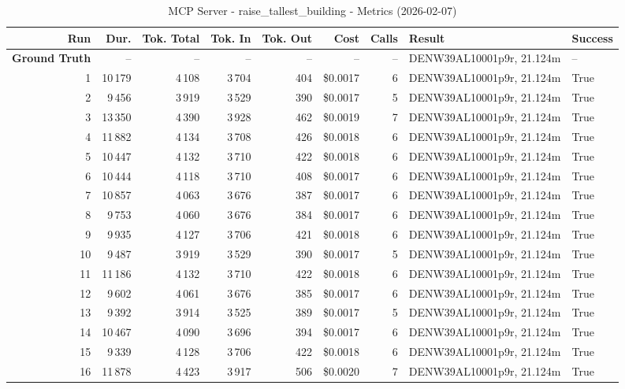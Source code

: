\documentclass[a4paper,11pt]{article}
\begin{document}
\begin{table}[ht]
\centering
\scriptsize
\caption{MCP Server - raise\_tallest\_building - Metrics (2026-02-07)}
\label{tab:mcp\_raise\_tallest\_building\_metrics\_2026-02-07}
\begin{tabular}{r r r r r r r p{3cm} l}
\hline
Run & Dur. & Tok. Total & Tok. In & Tok. Out & Cost & Calls & Result & Success \\
\hline
\textbf{Ground Truth} & -- & -- & -- & -- & -- & -- & DENW39AL10001p9r, 21.124m & -- \\
\hline
1 & 10\,179 & 4\,108 & 3\,704 & 404 & \$0.0017 & 6 & DENW39AL10001p9r, 21.124m & True \\
2 & 9\,456 & 3\,919 & 3\,529 & 390 & \$0.0017 & 5 & DENW39AL10001p9r, 21.124m & True \\
3 & 13\,350 & 4\,390 & 3\,928 & 462 & \$0.0019 & 7 & DENW39AL10001p9r, 21.124m & True \\
4 & 11\,882 & 4\,134 & 3\,708 & 426 & \$0.0018 & 6 & DENW39AL10001p9r, 21.124m & True \\
5 & 10\,447 & 4\,132 & 3\,710 & 422 & \$0.0018 & 6 & DENW39AL10001p9r, 21.124m & True \\
6 & 10\,444 & 4\,118 & 3\,710 & 408 & \$0.0017 & 6 & DENW39AL10001p9r, 21.124m & True \\
7 & 10\,857 & 4\,063 & 3\,676 & 387 & \$0.0017 & 6 & DENW39AL10001p9r, 21.124m & True \\
8 & 9\,753 & 4\,060 & 3\,676 & 384 & \$0.0017 & 6 & DENW39AL10001p9r, 21.124m & True \\
9 & 9\,935 & 4\,127 & 3\,706 & 421 & \$0.0018 & 6 & DENW39AL10001p9r, 21.124m & True \\
10 & 9\,487 & 3\,919 & 3\,529 & 390 & \$0.0017 & 5 & DENW39AL10001p9r, 21.124m & True \\
11 & 11\,186 & 4\,132 & 3\,710 & 422 & \$0.0018 & 6 & DENW39AL10001p9r, 21.124m & True \\
12 & 9\,602 & 4\,061 & 3\,676 & 385 & \$0.0017 & 6 & DENW39AL10001p9r, 21.124m & True \\
13 & 9\,392 & 3\,914 & 3\,525 & 389 & \$0.0017 & 5 & DENW39AL10001p9r, 21.124m & True \\
14 & 10\,467 & 4\,090 & 3\,696 & 394 & \$0.0017 & 6 & DENW39AL10001p9r, 21.124m & True \\
15 & 9\,339 & 4\,128 & 3\,706 & 422 & \$0.0018 & 6 & DENW39AL10001p9r, 21.124m & True \\
16 & 11\,878 & 4\,423 & 3\,917 & 506 & \$0.0020 & 7 & DENW39AL10001p9r, 21.124m & True \\

\end{tabular}
\end{table}
\end{document}
